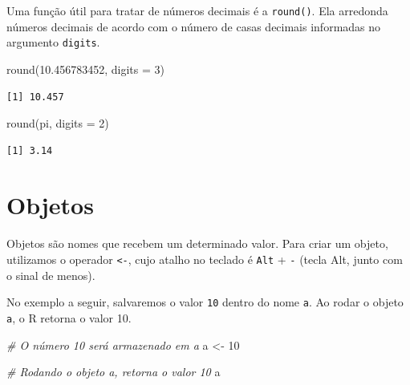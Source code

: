 \documentclass[
  brazilian,
]{book}
\newenvironment{Shaded}{\begin{snugshade}}{\end{snugshade}}
\newcommand{\AttributeTok}[1]{\textcolor[rgb]{0.77,0.63,0.00}{#1}}
\newcommand{\CommentTok}[1]{\textcolor[rgb]{0.56,0.35,0.01}{\textit{#1}}}
\newcommand{\DecValTok}[1]{\textcolor[rgb]{0.00,0.00,0.81}{#1}}
\newcommand{\FloatTok}[1]{\textcolor[rgb]{0.00,0.00,0.81}{#1}}
\newcommand{\FunctionTok}[1]{\textcolor[rgb]{0.00,0.00,0.00}{#1}}
\newcommand{\NormalTok}[1]{#1}
\newcommand{\OtherTok}[1]{\textcolor[rgb]{0.56,0.35,0.01}{#1}}
\begin{document}
Uma função útil para tratar de números decimais é a \texttt{round()}. Ela arredonda números decimais de acordo com o número de casas decimais informadas no argumento \texttt{digits}.

\begin{Shaded}
\begin{Highlighting}[]
\FunctionTok{round}\NormalTok{(}\FloatTok{10.456783452}\NormalTok{, }\AttributeTok{digits =} \DecValTok{3}\NormalTok{)}
\end{Highlighting}
\end{Shaded}

\begin{verbatim}
[1] 10.457
\end{verbatim}

\begin{Shaded}
\begin{Highlighting}[]
\FunctionTok{round}\NormalTok{(pi, }\AttributeTok{digits =} \DecValTok{2}\NormalTok{)}
\end{Highlighting}
\end{Shaded}

\begin{verbatim}
[1] 3.14
\end{verbatim}

\hypertarget{obj}{%
\section{Objetos}\label{obj}}

Objetos são nomes que recebem um determinado valor. Para criar um objeto, utilizamos o operador \texttt{\textless{}-}, cujo atalho no teclado é \texttt{Alt} + \texttt{-} (tecla Alt, junto com o sinal de menos).

No exemplo a seguir, salvaremos o valor \texttt{10} dentro do nome \texttt{a}. Ao rodar o objeto \texttt{a}, o R retorna o valor 10.

\begin{Shaded}
\begin{Highlighting}[]
\CommentTok{\# O número \textquotesingle{}10\textquotesingle{} será armazenado em \textquotesingle{}a\textquotesingle{}}
\NormalTok{a }\OtherTok{\textless{}{-}} \DecValTok{10}

\CommentTok{\# Rodando o objeto \textquotesingle{}a\textquotesingle{}, retorna o valor \textquotesingle{}10\textquotesingle{}}
\NormalTok{a}
\end{Highlighting}
\end{Shaded}
\end{document}

